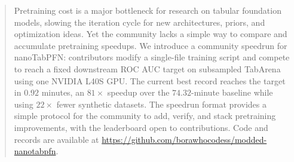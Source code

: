 \documentclass{article}
\theoremstyle{plain}
\theoremstyle{definition}
\theoremstyle{remark}
\begin{document}

\printAffiliationsAndNotice{}

\begin{abstract}
  Pretraining cost is a major bottleneck for research on tabular foundation models, slowing the iteration cycle for new architectures, priors, and optimization ideas.
  Yet the community lacks a simple way to compare and accumulate pretraining speedups.
  We introduce a community speedrun for nanoTabPFN: contributors modify a single-file training script and compete to reach a fixed downstream ROC AUC target on subsampled TabArena using one NVIDIA L40S GPU.
  The current best record reaches the target in $0.92$ minutes, an $81\times$ speedup over the $74.32$-minute baseline while using $22\times$ fewer synthetic datasets.
  The speedrun format provides a simple protocol for the community to add, verify, and stack pretraining improvements, with the leaderboard open to contributions.
  Code and records are available at \url{https://github.com/borawhocodess/modded-nanotabpfn}.
\end{abstract}
\end{document}
